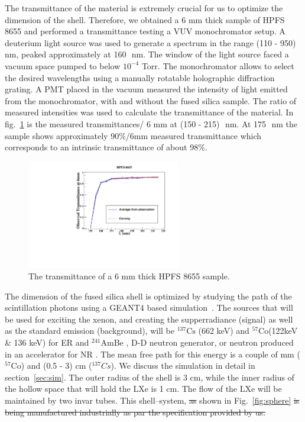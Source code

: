 The transmittance of the material is extremely crucial for us to optimize the dimension of the shell. Therefore, we obtained a 6 mm 
thick sample of HPFS 8655 and performed a transmittance testing a VUV monochromator setup. 
A deuterium light source was used to generate a spectrum in
the range (110 - 950)~\,nm, peaked approximately at 160~\,nm. The window of the light source faced a vacuum space pumped to below $10^{-4}$ Torr. 
The monochromator allows to select the desired wavelengths using a manually rotatable holographic diffraction grating. A PMT placed
in the vacuum measured the intensity of light emitted from the monochromator, with and without the fused silica sample. The ratio of 
measured intensities was used to calculate the transmittance of the material. In fig.~\ref{fig:transmittance} is the measured transmittances/ 6 mm at 
(150 - 215)~\,nm. At 175~\,nm the sample shows approximately 90\%/6mm measured transmittance which corresponds to an intrinsic transmittance of about 98\%.  

\begin{figure}
   \centering
   \includegraphics[width=0.6\textwidth]{ObservedTransmittance1.pdf}
   \caption{The transmittance of a 6 mm thick HPFS 8655 sample.} 
   \label{fig:transmittance}
\end{figure}

The dimension of the fused silica shell is optimized by studying the path of the scintillation photons using a GEANT4 based simulation~\cite{Agostinelli:2002hh}. 
The sources that will be used for exciting the xenon, and creating the supperradiance (signal) as well as the standard emission (background), 
will be $^{137} \mathrm{Cs}$ (662 keV) and $^{57} \mathrm{Co}$(122keV \& 136 keV) for ER and $^{241}$AmBe , D-D neutron generator, or neutron 
produced in an accelerator for NR . The mean free path for this energy is a couple of mm ($^{57} \mathrm{Co}$) and (0.5 - 3) cm ($^{137} Cs$).  
We discuss the simulation in detail in section~\ref{sec:sim}. 
The outer radius of the shell is 3 cm, while the inner radius of the hollow space that will hold the 
LXe is 1 cm. The flow of the LXe will be maintained by two invar tubes. This shell--system, \sout{as}  shown 
in Fig.~\ref{fig:sphere} \sout{is being manufactured industrially as par the specification provided by us.}

